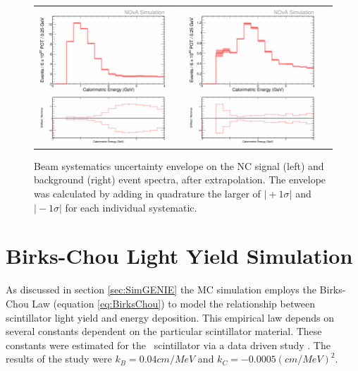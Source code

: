\begin{figure}[htb]
  \centering
  \begin{tabular}{c c}
    \includegraphics[width=.47\textwidth]{figures/Systs/cNCEXBeamSysts.png} &
    \includegraphics[width=.47\linewidth]{figures/Systs/cBGEXBeamSysts.png} \\
  \end{tabular}
  \caption[Beam Systematic Uncertainty Envelopes]{Beam systematics uncertainty envelope on the NC signal (left) and background (right) event spectra, after extrapolation. The envelope was calculated by adding in quadrature the larger of $\vert +1\sigma \vert$ and $\vert -1\sigma \vert$ for each individual systematic.}
  \label{fig:SystBeam}
\end{figure}

\section{Birks-Chou Light Yield Simulation}
\label{sec:SystBirks}

As discussed in section \ref{sec:SimGENIE} the MC simulation employs the Birks-Chou Law (equation \ref{eq:BirksChou}) to model the relationship between scintillator light yield and energy deposition. This empirical law depends on several constants dependent on the particular scintillator material. These constants were estimated for the \nova~scintillator via a data driven study \cite{ref:DanBirks}. The results of the study were $k_B = 0.04\unit{cm/MeV}$ and $k_C = -0.0005\unit{(cm/MeV)}^2$.

